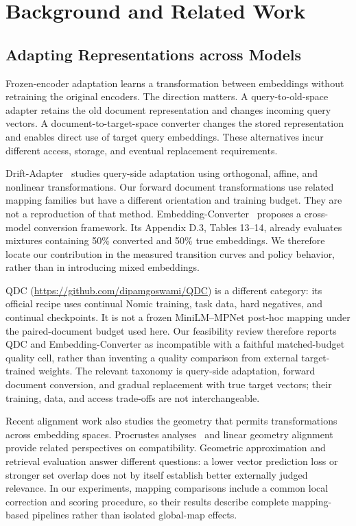 \documentclass[runningheads]{llncs}
\begin{document}
\section{Background and Related Work}

\subsection{Adapting Representations across Models}

Frozen-encoder adaptation learns a transformation between embeddings without retraining the original encoders. The direction matters. A query-to-old-space adapter retains the old document representation and changes incoming query vectors. A document-to-target-space converter changes the stored representation and enables direct use of target query embeddings. These alternatives incur different access, storage, and eventual replacement requirements.

Drift-Adapter~\cite{vejendla-2025-drift} studies query-side adaptation using orthogonal, affine, and nonlinear transformations. Our forward document transformations use related mapping families but have a different orientation and training budget. They are not a reproduction of that method. Embedding-Converter~\cite{yoon-arik-2025-embedding} proposes a cross-model conversion framework. Its Appendix D.3, Tables 13--14, already evaluates mixtures containing 50\% converted and 50\% true embeddings. We therefore locate our contribution in the measured transition curves and policy behavior, rather than in introducing mixed embeddings.

QDC (\url{https://github.com/dipamgoswami/QDC}) is a different category: its official recipe uses continual Nomic training, task data, hard negatives, and continual checkpoints. It is not a frozen MiniLM--MPNet post-hoc mapping under the paired-document budget used here. Our feasibility review therefore reports QDC and Embedding-Converter as incompatible with a faithful matched-budget quality cell, rather than inventing a quality comparison from external target-trained weights. The relevant taxonomy is query-side adaptation, forward document conversion, and gradual replacement with true target vectors; their training, data, and access trade-offs are not interchangeable.

Recent alignment work also studies the geometry that permits transformations across embedding spaces. Procrustes analyses~\cite{procrustes} and linear geometry alignment~\cite{minivec} provide related perspectives on compatibility. Geometric approximation and retrieval evaluation answer different questions: a lower vector prediction loss or stronger set overlap does not by itself establish better externally judged relevance. In our experiments, mapping comparisons include a common local correction and scoring procedure, so their results describe complete mapping-based pipelines rather than isolated global-map effects.
\end{document}

